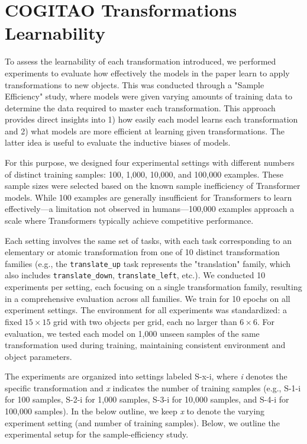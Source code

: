 \section{COGITAO Transformations Learnability} \label{appendix:transformation_learnability}

To assess the learnability of each transformation introduced, we performed experiments to evaluate how effectively the models in the paper learn to apply transformations to new objects. This was conducted through a "Sample Efficiency" study, where models were given varying amounts of training data to determine the data required to master each transformation. This approach provides direct insights into 1) how easily each model learns each transformation and 2) what models are more efficient at learning given transformations. The latter idea is useful to evaluate the inductive biases of models. 

For this purpose, we designed four experimental settings with different numbers of distinct training samples: 100, 1,000, 10,000, and 100,000 examples. These sample sizes were selected based on the known sample inefficiency of Transformer models. While 100 examples are generally insufficient for Transformers to learn effectively—a limitation not observed in humans—100,000 examples approach a scale where Transformers typically achieve competitive performance.

Each setting involves the same set of tasks, with each task corresponding to an elementary or atomic transformation from one of 10 distinct transformation families (e.g., the \texttt{translate\_up} task represents the "translation" family, which also includes \texttt{translate\_down}, \texttt{translate\_left}, etc.). We conducted 10 experiments per setting, each focusing on a single transformation family, resulting in a comprehensive evaluation across all families. We train for 10 epochs on all experiment settings.  
The environment for all experiments was standardized: a fixed $15 \times 15$ grid with two objects per grid, each no larger than $6 \times 6$. For evaluation, we tested each model on 1,000 unseen samples of the same transformation used during training, maintaining consistent environment and object parameters.

The experiments are organized into settings labeled S-x-i, where \textit{i} denotes the specific transformation and \textit{x} indicates the number of training samples (e.g., S-1-i for 100 samples, S-2-i for 1,000 samples, S-3-i for 10,000 samples, and S-4-i for 100,000 samples). In the below outline, we keep \textit{x} to denote the varying experiment setting (and number of training samples). Below, we outline the experimental setup for the sample-efficiency study. 

